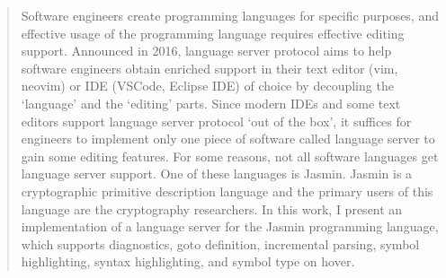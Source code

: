 \begin{abstract}

Software engineers create programming languages for specific purposes, and
effective usage of the programming language requires effective editing support.
Announced in 2016, language server protocol aims to help software engineers 
obtain enriched support in their text editor (vim, neovim) or IDE (VSCode,
Eclipse IDE) of choice by decoupling the `language' and the `editing' parts.
Since modern IDEs and some text editors support language server protocol `out of
the box', it suffices for engineers to implement only one piece of software
called language server to gain some editing features. For some reasons, not all
software languages get language server support. One of these languages is
Jasmin. Jasmin is a cryptographic primitive description language and the primary 
users of this language are the cryptography researchers. In this work, I present
an implementation of a language server for the Jasmin programming language,
which supports diagnostics, goto definition, incremental parsing, symbol
highlighting, syntax highlighting, and symbol type on hover.

\end{abstract}